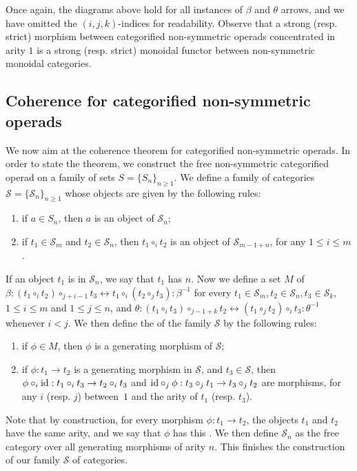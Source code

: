Once again, the diagrams above hold for all instances of $\beta$ and $\theta$ arrows, and we have omitted the $(i,j,k)$-indices for readability. 
Observe that a strong (resp. strict) morphism between categorified non-symmetric operads concentrated in arity $1$ is a strong (resp. strict) monoidal functor between non-symmetric monoidal categories. 


\subsection{Coherence for categorified non-symmetric operads}
\label{ss:coherence-catoperads}

We now aim at the coherence theorem for categorified non-symmetric operads.
In order to state the theorem, we construct the free non-symmetric categorified operad on a family of sets $S=\{S_n\}_{n \geq 1}$.
We define a family of categories~$\mathcal{S}=\{\mathcal{S}_n\}_{n \geq 1}$ whose objects are given by the following rules:
\begin{enumerate}
    \item if $a \in S_n$, then $a$ is an object of $\mathcal{S}_n$;
    \item if $t_1 \in \mathcal{S}_m$ and $t_2 \in \mathcal{S}_n$, then $t_1 \circ_i t_2$ is an object of $\mathcal{S}_{m-1+n}$, for any $1 \leq i \leq m$.
\end{enumerate}
If an object $t_1$ is in $\mathcal{S}_n$, we say that $t_1$ has  $n$. 
Now we define a set $M$ of  $\beta: (t_1 \circ_i t_2) \circ_{j+i-1} t_3 \leftrightarrow t_1 \circ_i (t_2 \circ_j t_3) : \beta^{-1}$ for every $t_1 \in \mathcal{S}_m, t_2 \in \mathcal{S}_n, t_3 \in \mathcal{S}_k$, $1 \leq i \leq m$ and $1 \leq j \leq n$, and $\theta: (t_1 \circ_i t_3) \circ_{j-1+k} t_2 \leftrightarrow (t_1 \circ_j t_2) \circ_i t_3 : \theta^{-1}$ whenever $i<j$.
We then define the  of the family $\mathcal{S}$ by the following rules:
\begin{enumerate}
    \item if $\phi \in M$, then $\phi$ is a generating morphism of $\mathcal{S}$; 
    \item if $\phi : t_1 \to t_2$ is a generating morphism in $\mathcal{S}$, and $t_3 \in \mathcal{S}$, then $\phi \circ_i \mathrm{id} : t_1 \circ_i t_3 \to t_2 \circ_i t_3$ and $\mathrm{id} \circ_j \phi : t_3 \circ_j t_1 \to t_3 \circ_j t_2$ are  morphisms, for any $i$ (resp. $j$) between~$1$ and the arity of $t_1$ (resp. $t_3$).
\end{enumerate}
Note that by construction, for every morphism $\phi : t_1 \to t_2$, the objects $t_1$ and $t_2$ have the same arity, and we say that $\phi$ has this . 
We then define $\mathcal{S}_n$ as the free category over all generating morphisms of arity $n$. 
This finishes the construction of our family $\mathcal{S}$ of categories.

